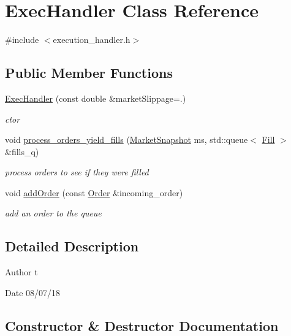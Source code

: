 \hypertarget{classExecHandler}{}\section{Exec\+Handler Class Reference}
\label{classExecHandler}


{\ttfamily \#include $<$execution\+\_\+handler.\+h$>$}

\subsection*{Public Member Functions}
\begin{DoxyCompactItemize}
\item 
\hyperlink{classExecHandler_a93dc054d2361eac1f6ca3856d22d197f}{Exec\+Handler} (const double \&market\+Slippage=.)
\begin{DoxyCompactList}\small\item\em ctor \end{DoxyCompactList}\item 
void \hyperlink{classExecHandler_a041152ee704c3688b1097babbc830494}{process\+\_\+orders\+\_\+yield\+\_\+fills} (\hyperlink{classMarketSnapshot}{Market\+Snapshot} ms, std\+::queue$<$ \hyperlink{classFill}{Fill} $>$ \&fills\+\_\+q)
\begin{DoxyCompactList}\small\item\em process orders to see if they were filled \end{DoxyCompactList}\item 
void \hyperlink{classExecHandler_aee7a8bd39ed6fc1f9818c22103c0820a}{add\+Order} (const \hyperlink{classOrder}{Order} \&incoming\+\_\+order)
\begin{DoxyCompactList}\small\item\em add an order to the queue \end{DoxyCompactList}\end{DoxyCompactItemize}


\subsection{Detailed Description}
\begin{DoxyAuthor}{Author}
t 
\end{DoxyAuthor}
\begin{DoxyDate}{Date}
08/07/18 
\end{DoxyDate}


\subsection{Constructor \& Destructor Documentation}
\mbox{\label{classExecHandler_a93dc054d2361eac1f6ca3856d22d197f}} 
